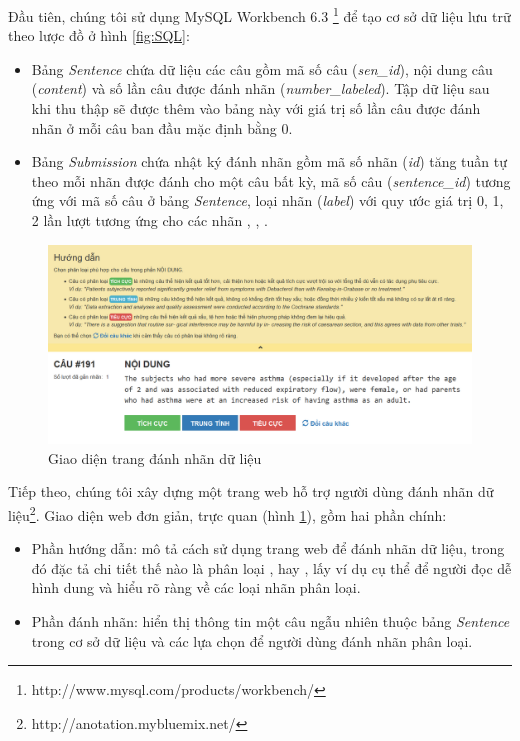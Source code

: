 Đầu tiên, chúng tôi sử dụng MySQL Workbench 6.3 \footnote{http://www.mysql.com/products/workbench/} để tạo cơ sở dữ liệu lưu trữ theo lược đồ ở hình \ref{fig:SQL}:
\begin{itemize}
\item Bảng \textit{Sentence} chứa dữ liệu các câu gồm mã số câu (\textit{sen\_id}), nội dung câu (\textit{content}) và số lần câu được đánh nhãn (\textit{number\_labeled}). Tập dữ liệu sau khi thu thập sẽ được thêm vào bảng này với giá trị số lần câu được đánh nhãn ở mỗi câu ban đầu mặc định bằng 0.
\item Bảng \textit{Submission} chứa nhật ký đánh nhãn gồm mã số nhãn (\textit{id}) tăng tuần tự theo mỗi nhãn được đánh cho một câu bất kỳ, mã số câu (\textit{sentence\_id}) tương ứng với mã số câu ở bảng \textit{Sentence}, loại nhãn (\textit{label}) với quy ước giá trị 0, 1, 2 lần lượt tương ứng cho các nhãn \tieucuc, \trungtinh, \tichcuc.
\end{itemize}

\begin{figure}[H]
\centering
\includegraphics[scale=0.45]{../hinh/Webpage.png}
\caption{Giao diện trang đánh nhãn dữ liệu}
\label{fig:web}
\end{figure}

Tiếp theo, chúng tôi xây dựng một trang web hỗ trợ người dùng đánh nhãn dữ liệu\footnote{http://anotation.mybluemix.net/}. Giao diện web đơn giản, trực quan (hình \ref{fig:web}), gồm hai phần chính:
\begin{itemize}
\item Phần hướng dẫn: mô tả cách sử dụng trang web để đánh nhãn dữ liệu, trong đó đặc tả chi tiết thế nào là phân loại \tichcuc, \tieucuc hay \trungtinh, lấy ví dụ cụ thể để người đọc dễ hình dung và hiểu rõ ràng về các loại nhãn phân loại.
\item Phần đánh nhãn: hiển thị thông tin một câu ngẫu nhiên thuộc bảng \textit{Sentence} trong cơ sở dữ liệu và các lựa chọn để người dùng đánh nhãn phân loại. 
\end{itemize}

